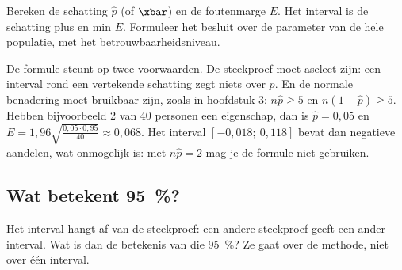 
\begin{werkwijze}
Bereken de schatting $\hat{p}$ (of $\xbar$) en de foutenmarge $E$. Het interval is de schatting plus en min $E$. Formuleer het besluit over de parameter van de hele populatie, met het betrouwbaarheidsniveau.
\end{werkwijze}

\begin{oefeningen}
\end{oefeningen}

De formule steunt op twee voorwaarden. De steekproef moet aselect zijn: een interval rond een vertekende schatting zegt niets over $p$. En de normale benadering moet bruikbaar zijn, zoals in hoofdstuk 3: $n\hat{p} \geqslant 5$ en $n(1 - \hat{p}) \geqslant 5$. Hebben bijvoorbeeld 2 van 40 personen een eigenschap, dan is $\hat{p} = 0{,}05$ en $E = 1{,}96\sqrt{\frac{0{,}05 \cdot 0{,}95}{40}} \approx 0{,}068$. Het interval $[-0{,}018;\ 0{,}118]$ bevat dan negatieve aandelen, wat onmogelijk is: met $n\hat{p} = 2$ mag je de formule niet gebruiken.

\begin{oefeningen}
\end{oefeningen}

\subsection{Wat betekent 95~\%?}

Het interval hangt af van de steekproef: een andere steekproef geeft een ander interval. Wat is dan de betekenis van die 95~\%? Ze gaat over de methode, niet over één interval.

